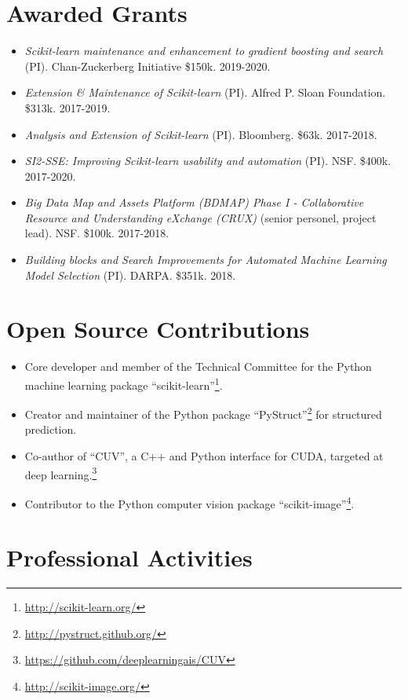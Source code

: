 \documentclass[a4paper,11pt]{article}
\begin{document}
\section{Awarded Grants}
\begin{itemize}
    \item \emph{Scikit-learn maintenance and enhancement to gradient boosting and search} (PI). Chan-Zuckerberg Initiative \$150k. 2019-2020.
    \item \emph{Extension \& Maintenance of Scikit-learn} (PI). Alfred P. Sloan Foundation. \$313k. 2017-2019.
    \item \emph{Analysis and Extension of Scikit-learn} (PI). Bloomberg. \$63k. 2017-2018.
    \item \emph{SI2-SSE: Improving Scikit-learn usability and automation} (PI). NSF. \$400k. 2017-2020.
    \item \emph{Big Data Map and Assets Platform (BDMAP) Phase I - Collaborative Resource and Understanding eXchange (CRUX)} (senior personel, project lead). NSF. \$100k. 2017-2018.
    \item \emph{Building blocks and Search Improvements for Automated Machine Learning Model Selection} (PI). DARPA. \$351k. 2018.
\end{itemize}

\pagebreak

\section{Open Source Contributions}
\begin{itemize}
    \item Core developer and member of the Technical Committee for the Python machine learning package ``scikit-learn''\footnote{\url{http://scikit-learn.org/}}.
    \item Creator and maintainer of the Python package ``PyStruct''\footnote{\url{http://pystruct.github.org/}} for structured prediction.
    \item Co-author of ``CUV'', a C++ and Python interface for CUDA,
        targeted at deep learning.\footnote{\url{https://github.com/deeplearningais/CUV}}
    \item Contributor to the Python computer vision package ``scikit-image''\footnote{\url{http://scikit-image.org/}}.
\end{itemize}

\section{Professional Activities}
\end{document}
